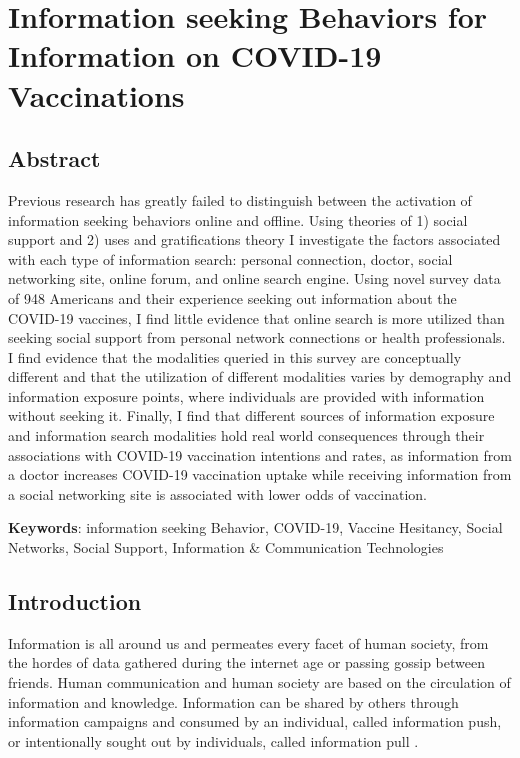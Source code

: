 \hypertarget{paper-2}{\chapter{Information seeking Behaviors for Information on COVID-19 Vaccinations}\label{paper-2}}

\hypertarget{abstract}{\section{Abstract}\label{abstract}}

Previous research has greatly failed to distinguish between the activation of
information seeking behaviors online and offline. Using theories of 1) social
support and 2) uses and gratifications theory I investigate the factors
associated with each type of information search: 
personal connection, doctor, social networking site, online forum, and online
search engine. Using novel survey data of 948 Americans and their experience
seeking out information about the COVID-19 vaccines, I find little evidence that
online search is more utilized than seeking social support from personal network
connections or health professionals. I find evidence that the modalities queried
in this survey are conceptually different and that the utilization of different
modalities varies by demography and information exposure points, where
individuals are provided with information without seeking it. Finally, I find that
different sources of information exposure and information search modalities hold
real world consequences through their associations with COVID-19 vaccination
intentions and rates, as information from a doctor increases COVID-19
vaccination uptake while receiving information from a social networking site
is associated with lower odds of vaccination.

\textbf{Keywords}: information seeking Behavior, COVID-19, Vaccine Hesitancy, Social Networks, Social Support, Information \& Communication Technologies

\hypertarget{intro-1}{\section{Introduction}\label{intro-1}}

Information is all around us and permeates every facet of human society, from
the hordes of data gathered during the internet age or passing gossip between
friends. Human communication and human society are based on the circulation of
information and knowledge. Information can be shared by others through
information campaigns and consumed by an individual, called information push, or
intentionally sought out by individuals, called information pull
\citep{cybenkoFoundationsInformationPush1999}.

